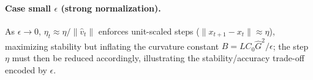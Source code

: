 \documentclass[11pt]{article}
\begin{document}
\paragraph{Case small $\epsilon$ (strong normalization).}
As $\epsilon\to 0$, $\eta_t \approx \eta/\|\hat v_t\|$ enforces unit-scaled steps
($\|x_{t+1}-x_t\|\approx\eta$), maximizing stability but inflating the curvature constant
$B=LC_0\hat G^2/\epsilon$; the step $\eta$ must then be reduced accordingly, illustrating
the stability/accuracy trade-off encoded by $\epsilon$.
\end{document}
